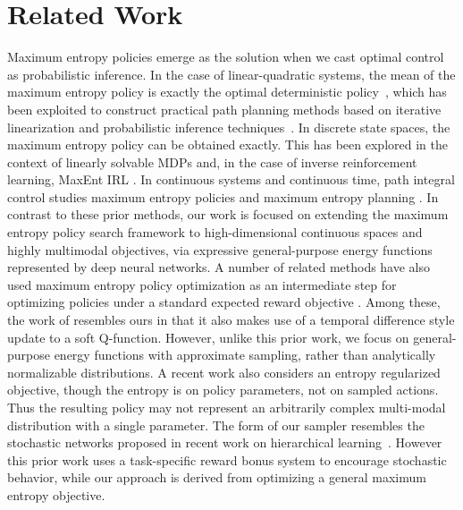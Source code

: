 \documentclass{article}
\begin{document}
\vspace{-2mm}
\section{Related Work}
\label{sec:related}
\vspace{-1mm}

%
Maximum entropy policies emerge as the solution when we cast optimal control as probabilistic inference. In the case of linear-quadratic systems, the mean of the maximum entropy policy is exactly the optimal deterministic policy~\cite{todorov2008general}, which has been exploited to construct practical path planning methods based on iterative linearization and probabilistic inference techniques~\cite{toussaint2009robot}.
%
%
%
In discrete state spaces, the maximum entropy policy can be obtained exactly. This has been explored in the context of linearly solvable MDPs \cite{todorov2006linearly}
%
and, in the case of inverse reinforcement learning, MaxEnt IRL \cite{ziebart2008maximum}.
%
%
In continuous systems and continuous time, path integral control studies maximum entropy policies and maximum entropy planning \cite{kappen2005path}. In contrast to these prior methods, our work is focused on extending the maximum entropy policy search framework to high-dimensional continuous spaces and highly multimodal objectives, via expressive general-purpose energy functions represented by deep neural networks. A number of related methods have also used maximum entropy policy optimization as an intermediate step for optimizing policies under a standard expected reward objective \cite{peters2010relative,neumann2011variational,rawlik2012stochastic,fox2015taming}. Among these, the work of \citet{rawlik2012stochastic} resembles ours in that it also makes use of a temporal difference style update to a soft Q-function. However, unlike this prior work, we focus on general-purpose energy functions with approximate sampling, rather than analytically normalizable distributions. A recent work \cite{liu2017stein} also considers an entropy regularized objective, though the entropy is on policy parameters, not on sampled actions. Thus the resulting policy may not represent an arbitrarily complex multi-modal distribution with a single parameter. The form of our sampler resembles the stochastic networks proposed in recent work on hierarchical learning~\cite{florensa2017stochastic}. However this prior work uses a task-specific reward bonus system to encourage stochastic behavior, while our approach is derived from optimizing a general maximum entropy objective.
%
%
\end{document}
